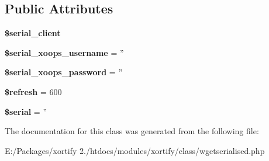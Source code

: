 \subsection*{Public Attributes}
\begin{DoxyCompactItemize}
\item 
\hypertarget{class_w_g_e_t_s_e_r_i_a_l_i_s_e_d_xortify_exchange_a65cdfa324095750649dd54a5ccf7a3b0}{{\bfseries \$serial\-\_\-client}}\label{class_w_g_e_t_s_e_r_i_a_l_i_s_e_d_xortify_exchange_a65cdfa324095750649dd54a5ccf7a3b0}

\item 
\hypertarget{class_w_g_e_t_s_e_r_i_a_l_i_s_e_d_xortify_exchange_ab2a99524a685236c1cdefabc357449c1}{{\bfseries \$serial\-\_\-xoops\-\_\-username} = ''}\label{class_w_g_e_t_s_e_r_i_a_l_i_s_e_d_xortify_exchange_ab2a99524a685236c1cdefabc357449c1}

\item 
\hypertarget{class_w_g_e_t_s_e_r_i_a_l_i_s_e_d_xortify_exchange_aec5a40c6f069ce3c9db0a4c18dffde2a}{{\bfseries \$serial\-\_\-xoops\-\_\-password} = ''}\label{class_w_g_e_t_s_e_r_i_a_l_i_s_e_d_xortify_exchange_aec5a40c6f069ce3c9db0a4c18dffde2a}

\item 
\hypertarget{class_w_g_e_t_s_e_r_i_a_l_i_s_e_d_xortify_exchange_aaaf8bfa309a4ae74e52588cdf7c3b252}{{\bfseries \$refresh} = 600}\label{class_w_g_e_t_s_e_r_i_a_l_i_s_e_d_xortify_exchange_aaaf8bfa309a4ae74e52588cdf7c3b252}

\item 
\hypertarget{class_w_g_e_t_s_e_r_i_a_l_i_s_e_d_xortify_exchange_a6e35af5b87885dd9839ec2213f336bf1}{{\bfseries \$serial} = ''}\label{class_w_g_e_t_s_e_r_i_a_l_i_s_e_d_xortify_exchange_a6e35af5b87885dd9839ec2213f336bf1}

\end{DoxyCompactItemize}


The documentation for this class was generated from the following file\-:\begin{DoxyCompactItemize}
\item 
E\-:/\-Packages/xortify 2./htdocs/modules/xortify/class/wgetserialised.\-php\end{DoxyCompactItemize}
